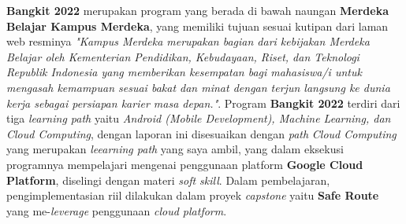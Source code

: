\noindent \textbf{Bangkit 2022} merupakan program yang berada di bawah naungan \textbf{Merdeka Belajar Kampus Merdeka}, yang memiliki tujuan sesuai kutipan dari laman web resminya \textit{"Kampus Merdeka merupakan bagian dari kebijakan Merdeka Belajar oleh Kementerian Pendidikan, Kebudayaan, Riset, dan Teknologi Republik Indonesia yang memberikan kesempatan bagi mahasiswa/i untuk mengasah kemampuan sesuai bakat dan minat dengan terjun langsung ke dunia kerja sebagai persiapan karier masa depan."}. Program \textbf{Bangkit 2022} terdiri dari tiga \textit{learning path} yaitu \textit{Android (Mobile Development), Machine Learning, dan Cloud Computing}, dengan laporan ini disesuaikan dengan \textit{path} \textit{Cloud Computing} yang merupakan \textit{leearning path} yang saya ambil, yang dalam eksekusi programnya mempelajari mengenai penggunaan platform \textbf{Google Cloud Platform}, diselingi dengan materi \textit{soft skill}. Dalam pembelajaran, pengimplementasian riil dilakukan dalam proyek \textit{capstone} yaitu \textbf{Safe Route} yang me-\textit{leverage} penggunaan \textit{cloud platform}.

\vspace{5mm}